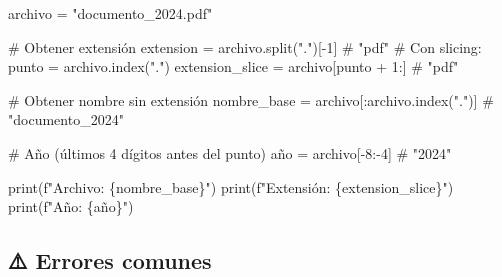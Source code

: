 \documentclass[
  doc,
  floatsintext,
  longtable,
  a4paper,
  nolmodern,
  notxfonts,
  notimes,
  12pt,
  colorlinks=true,linkcolor=blue,citecolor=blue,urlcolor=blue]{apa7}
\newenvironment{Shaded}{\begin{snugshade}}{\end{snugshade}}
\newcommand{\BuiltInTok}[1]{\textcolor[rgb]{0.00,0.23,0.31}{#1}}
\newcommand{\CommentTok}[1]{\textcolor[rgb]{0.37,0.37,0.37}{#1}}
\newcommand{\DecValTok}[1]{\textcolor[rgb]{0.68,0.00,0.00}{#1}}
\newcommand{\NormalTok}[1]{\textcolor[rgb]{0.00,0.23,0.31}{#1}}
\newcommand{\OperatorTok}[1]{\textcolor[rgb]{0.37,0.37,0.37}{#1}}
\newcommand{\SpecialCharTok}[1]{\textcolor[rgb]{0.37,0.37,0.37}{#1}}
\newcommand{\SpecialStringTok}[1]{\textcolor[rgb]{0.13,0.47,0.30}{#1}}
\newcommand{\StringTok}[1]{\textcolor[rgb]{0.13,0.47,0.30}{#1}}
\begin{document}
\begin{Shaded}
\begin{Highlighting}[]
\NormalTok{archivo }\OperatorTok{=} \StringTok{"documento\_2024.pdf"}

\CommentTok{\# Obtener extensión}
\NormalTok{extension }\OperatorTok{=}\NormalTok{ archivo.split(}\StringTok{"."}\NormalTok{)[}\OperatorTok{{-}}\DecValTok{1}\NormalTok{]  }\CommentTok{\# "pdf"}
\CommentTok{\# Con slicing:}
\NormalTok{punto }\OperatorTok{=}\NormalTok{ archivo.index(}\StringTok{"."}\NormalTok{)}
\NormalTok{extension\_slice }\OperatorTok{=}\NormalTok{ archivo[punto }\OperatorTok{+} \DecValTok{1}\NormalTok{:]  }\CommentTok{\# "pdf"}

\CommentTok{\# Obtener nombre sin extensión}
\NormalTok{nombre\_base }\OperatorTok{=}\NormalTok{ archivo[:archivo.index(}\StringTok{"."}\NormalTok{)]  }\CommentTok{\# "documento\_2024"}

\CommentTok{\# Año (últimos 4 dígitos antes del punto)}
\NormalTok{año }\OperatorTok{=}\NormalTok{ archivo[}\OperatorTok{{-}}\DecValTok{8}\NormalTok{:}\OperatorTok{{-}}\DecValTok{4}\NormalTok{]  }\CommentTok{\# "2024"}

\BuiltInTok{print}\NormalTok{(}\SpecialStringTok{f"Archivo: }\SpecialCharTok{\{}\NormalTok{nombre\_base}\SpecialCharTok{\}}\SpecialStringTok{"}\NormalTok{)}
\BuiltInTok{print}\NormalTok{(}\SpecialStringTok{f"Extensión: }\SpecialCharTok{\{}\NormalTok{extension\_slice}\SpecialCharTok{\}}\SpecialStringTok{"}\NormalTok{)}
\BuiltInTok{print}\NormalTok{(}\SpecialStringTok{f"Año: }\SpecialCharTok{\{}\NormalTok{a}\SpecialCharTok{ñ}\NormalTok{o}\SpecialCharTok{\}}\SpecialStringTok{"}\NormalTok{)}
\end{Highlighting}
\end{Shaded}

\subsection{⚠️ Errores comunes}\label{errores-comunes}
\end{document}
